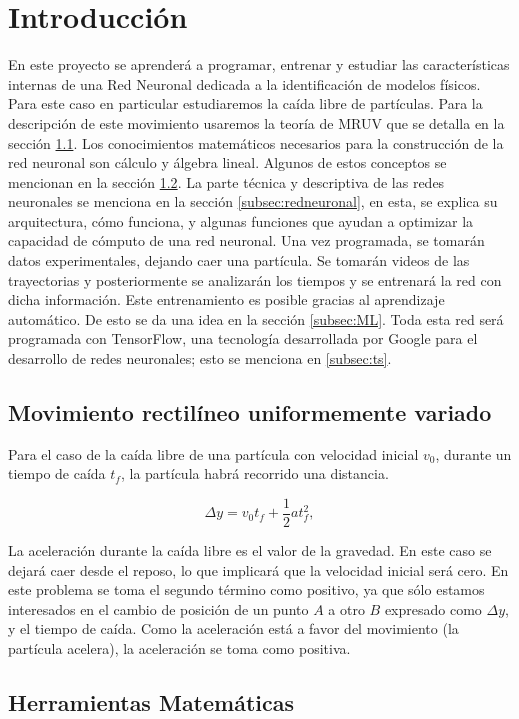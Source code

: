 \documentclass[titlepage,11pt]{article}
\begin{document}
\section{Introducción}
\label{sec:introduccion}
En este proyecto se aprenderá a programar, entrenar y estudiar las características internas de una Red Neuronal dedicada a la identificación de modelos físicos. Para este caso en particular estudiaremos la caída libre de partículas. Para la descripción de este movimiento usaremos la teoría de MRUV que se detalla en la sección \ref{subsec:mru}. Los conocimientos matemáticos  necesarios para la construcción de la red neuronal son cálculo y álgebra lineal. Algunos de estos conceptos se mencionan en la sección \ref{subsec:mat}. La parte técnica y descriptiva de las redes neuronales se menciona en la sección \ref{subsec:redneuronal}, en esta, se explica su arquitectura, cómo funciona, y algunas funciones que ayudan a optimizar la capacidad de cómputo de una red neuronal. Una vez programada, se tomarán datos experimentales, dejando caer una partícula. Se tomar\'an videos de las trayectorias y posteriormente se analizar\'an los tiempos y se entrenará la red con dicha información. Este entrenamiento es posible gracias al aprendizaje automático. De esto se da una idea en la sección \ref{subsec:ML}. Toda esta red será programada con TensorFlow, una tecnología desarrollada por Google para el desarrollo de redes neuronales; esto se menciona en \ref{subsec:ts}.

\subsection{Movimiento rectilíneo uniformemente variado}
\label{subsec:mru}

	Para el caso de la caída libre de una partícula con velocidad inicial $v_0$, durante un tiempo de caída $t_f$, la partícula habrá recorrido una distancia.
	
	$$\Delta y=v_0 t_f+\frac{1}{2}a t_f^2,$$

	La aceleración durante la caída libre es el valor de la gravedad. En este caso se dejará caer desde el reposo, lo que implicará que la velocidad inicial será cero. En este problema se toma el segundo término como positivo, ya que s\'olo estamos interesados en el cambio de posición de un punto $A$ a otro $B$ expresado como $\Delta y$, y el tiempo de caída. Como la aceleración está a favor del movimiento (la partícula acelera), la aceleración se toma como positiva.

\subsection{Herramientas Matemáticas}
\label{subsec:mat}
\end{document}
